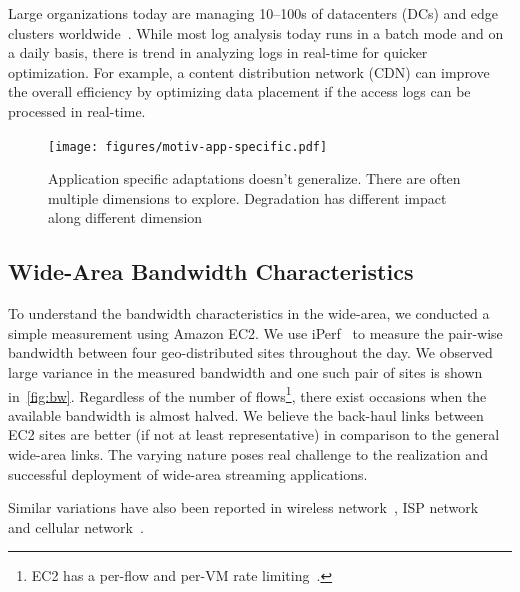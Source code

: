  Large organizations today are managing 10--100s of
datacenters (DCs) and edge clusters worldwide~\cite{calder2013mapping}. While
most log analysis today runs in a batch mode and on a daily basis, there is
trend in analyzing logs in real-time for quicker optimization. For example, a
content distribution network (CDN) can improve the overall efficiency by
optimizing data placement if the access logs can be processed in real-time.


\begin{figure}
  \centering
  \texttt{[image: figures/motiv-app-specific.pdf]}
  \caption{Application specific adaptations doesn't generalize. There are often
    multiple dimensions to explore. Degradation has different impact along
    different dimension}
  \label{fig:app-specific}
\end{figure}

\subsection{Wide-Area Bandwidth Characteristics}
\label{sec:wide-area-bandwidth}

To understand the bandwidth characteristics in the wide-area, we conducted a
simple measurement using Amazon EC2. We use iPerf~\cite{iperf3} to measure the
pair-wise bandwidth between four geo-distributed sites throughout the day. We
observed large variance in the measured bandwidth and one such pair of sites is
shown in~\autoref{fig:bw}. Regardless of the number of flows\footnote{EC2 has a
  per-flow and per-VM rate limiting~\cite{zhang2016guaranteeing}.}, there exist
occasions when the available bandwidth is almost halved. We believe the
back-haul links between EC2 sites are better (if not at least representative) in
comparison to the general wide-area links. The varying nature poses real
challenge to the realization and successful deployment of wide-area streaming
applications.

Similar variations have also been reported in wireless
network~\cite{biswas2015large}, ISP network~\cite{grover2013peeking} and
cellular network~\cite{nikravesh2014mobile}.

